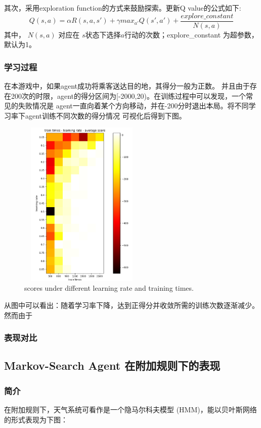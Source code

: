 \documentclass{article}
\begin{document}
\begin{CJK}{UTF8}{gbsn}
其次，采用exploration function的方式来鼓励探索。更新Q value的公式如下: 
$$
Q(s,a) = \alpha R(s,a,s')+\gamma max_{a'}Q(s',a') + \frac{explore\_constant}{N(s,a)}
$$
其中， $N(s,a)$ 对应在 $s$状态下选择$a$行动的次数；explore\_constant 为超参数，默认为1。
\subsubsection{学习过程}
在本游戏中，如果agent成功将乘客送达目的地，其得分一般为正数。
并且由于存在200次的时限，agent的得分区间为[-2000,20)。在训练过程中可以发现，一个常见的失败情况是
agent一直向着某个方向移动，并在-200分时退出本局。将不同学习率下agent训练不同次数的得分情况
可视化后得到下图。
\begin{figure}[htbp]
  \centering
  \includegraphics[width=6cm,height=8cm]{images/small_map_origin.png}
  \caption{scores under different learning rate and training times.}
\end{figure}
从图中可以看出：随着学习率下降，达到正得分并收敛所需的训练次数逐渐减少。
然而由于

\subsubsection{表现对比}

\subsection{Markov-Search Agent 在附加规则下的表现}
\subsubsection{简介}
在附加规则下，天气系统可看作是一个隐马尔科夫模型 (HMM)，能以贝叶斯网络的形式表现为下图：


\end{CJK}
\end{document}
